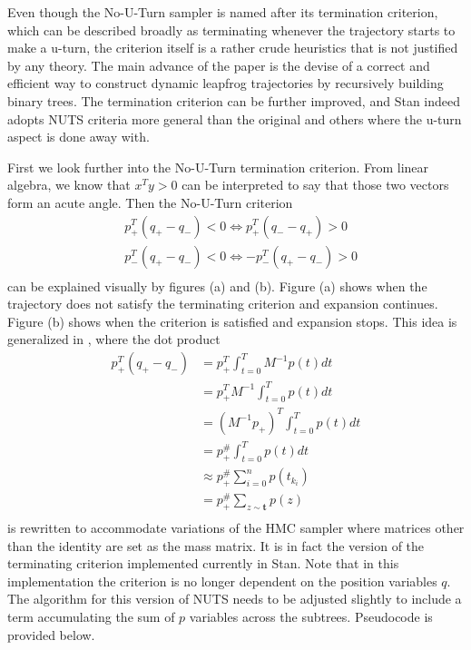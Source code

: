 \documentclass[12pt]{report}
\begin{document}
Even though the No-U-Turn sampler is named after its termination criterion, which can be described broadly as terminating whenever the trajectory starts to make a u-turn, the criterion itself is a rather crude heuristics that is not justified by any theory. The main advance of the paper is the devise of a correct and efficient way to construct dynamic leapfrog trajectories by recursively building binary trees. The termination criterion can be further improved, and Stan indeed adopts NUTS criteria more general than the original and others where the u-turn aspect is done away with. 

First we look further into the No-U-Turn termination criterion. From linear algebra, we know that $x^Ty > 0 $ can be interpreted to say that those two vectors form an acute angle. Then the No-U-Turn criterion 
\begin{align*}
&p_{+}^T (q_+ -q_-) < 0 \Leftrightarrow p_+^T (q_- - q_+) > 0 \\
&p_{-}^T (q_+ -q_-) < 0 \Leftrightarrow -p_-^T (q_+ - q_-) > 0 \\
\end{align*}
can be explained visually by figures (a) and (b). Figure (a) shows when the trajectory does not satisfy the terminating criterion and expansion continues. Figure (b) shows when the criterion is satisfied and expansion stops. This idea is generalized in \cite{betancourt2013generalizing}, where the dot product 
\begin{align*}
 p_{+}^T (q_{+} -q_{-})  
 &=p_{+}^T \int_{t=0}^{T} M^{-1}p(t) dt   \\
 &=p_{+}^T M^{-1} \int_{t=0}^{T} p(t)dt \\
 &=(M^{-1} p_{+})^T  \int_{t=0}^{T} p(t)dt \\
 &= p^{\#}_{+}  \int_{t=0}^{T} p(t)dt \\
 &\approx p^{\#}_{+} \sum_{i=0}^n p(t_{k_i}) \\
 &=  p^{\#}_{+} \sum_{z \sim \mathbf{t}} p(z) \\
\end{align*} 
is rewritten to accommodate variations of the HMC sampler where matrices other than the identity are set as the mass matrix. It is in fact the version of the terminating criterion implemented currently in Stan. Note that in this implementation the criterion is no longer dependent on the position variables $q$. The algorithm for this version of NUTS needs to be adjusted slightly to include a term accumulating the sum of $p$ variables across the subtrees. Pseudocode is provided below.
\end{document}

